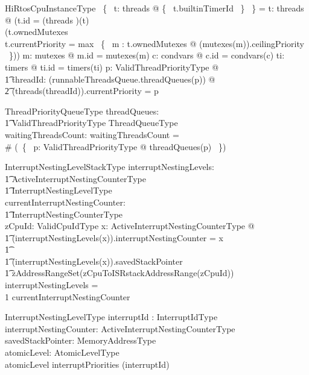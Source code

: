 \documentclass[11pt,letterpaper,twoside,openany]{book}
\begin{document}
\begin{schema}{HiRtosCpuInstanceType}
\also
    \bigcap~\{~ t: \ran threads @ \{~ t.builtinTimerId ~\} ~\} = \emptyset
\also
    \forall t: \ran threads @ (t.id = (threads \inv)(t) \land \\
    (t.ownedMutexes \neq \emptyset \implies \\
     t.currentPriority = max~ \{~ m : \ran t.ownedMutexes @ (mutexes(m)).ceilingPriority ~\}))
\also
    \forall m: \ran mutexes @ m.id = mutexes\inv(m)
\also
    \forall c: \ran condvars @  c.id = condvars\inv(c)
\also
    \forall ti: \ran timers @ ti.id = timers\inv(ti)
\also
    \forall p: ValidThreadPriorityType @ \\
\t1    \forall threadId: \ran (runnableThreadsQueue.threadQueues(p)) @ \\
\t2    (threads(threadId)).currentPriority = p
\end{schema}

\begin{schema}{ThreadPriorityQueueType}
    threadQueues: \\
    \t1 ValidThreadPriorityType \inj ThreadQueueType \\
    waitingThreadsCount: \nat
\where
   waitingThreadsCount = \\
   \# (\bigcup ~\{~ p: ValidThreadPriorityType @ threadQueues(p) ~\})
\end{schema}

\begin{schema}{InterruptNestingLevelStackType}
       interruptNestingLevels: \\
    \t1 ActiveInterruptNestingCounterType \inj \\
    \t1 InterruptNestingLevelType \\
    currentInterruptNestingCounter: \\
    \t1 InterruptNestingCounterType \\
    zCpuId: ValidCpuIdType
\where
   \forall x: ActiveInterruptNestingCounterType @ \\
\t1   (interruptNestingLevels(x)).interruptNestingCounter = x \\
\t1   \land \\
\t1   (interruptNestingLevels(x)).savedStackPointer \in \\
\t1        zAddressRangeSet(zCpuToISRstackAddressRange(zCpuId))
\also
   \dom interruptNestingLevels = \\
   1 \upto currentInterruptNestingCounter
\end{schema}

\begin{schema}{InterruptNestingLevelType}
   interruptId : InterruptIdType \\
   interruptNestingCounter: ActiveInterruptNestingCounterType \\
   savedStackPointer: MemoryAddressType \\
   atomicLevel: AtomicLevelType \\
\where
   atomicLevel \leq interruptPriorities (interruptId)
\also

\end{schema}
\end{document}
